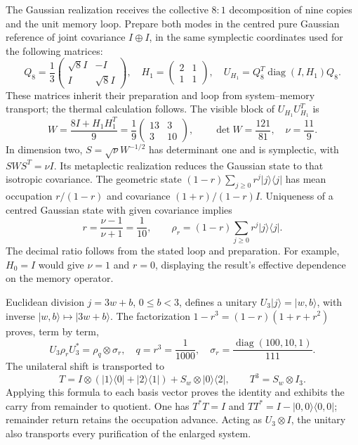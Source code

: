 The Gaussian realization receives the collective $8:1$ decomposition
of nine copies and the unit memory loop. Prepare both modes in the centred
pure Gaussian reference of joint covariance $I\oplus I$, in the same
symplectic coordinates used for the following matrices:
\[
 Q_8=\frac13\begin{pmatrix}\sqrt8 I&-I\\I&\sqrt8 I\end{pmatrix},
 \quad H_1=\begin{pmatrix}2&1\\1&1\end{pmatrix},
 \quad U_{H_1}=Q_8^T\operatorname{diag}(I,H_1)Q_8.
\]
These matrices inherit their preparation and loop from system--memory
transport; the thermal calculation follows. The visible block of
$U_{H_1}U_{H_1}^T$ is
\[
 W=\frac{8I+H_1H_1^T}{9}
 =\frac19\begin{pmatrix}13&3\\3&10\end{pmatrix},
 \qquad\det W=\frac{121}{81},\quad\nu=\frac{11}{9}.
\]
In dimension two, $S=\sqrt\nu W^{-1/2}$ has determinant one and is
symplectic, with $SWS^T=\nu I$. Its metaplectic realization reduces
the Gaussian state to that isotropic covariance. The geometric state
$(1-r)\sum_{j\geq0}r^j|j\rangle\langle j|$ has mean occupation
$r/(1-r)$ and covariance $(1+r)/(1-r)I$. Uniqueness of a centred
Gaussian state with given covariance implies
\begin{equation}
 r=\frac{\nu-1}{\nu+1}=\frac1{10},\qquad
 \rho_r=(1-r)\sum_{j\geq0}r^j|j\rangle\langle j|.
 \label{eq:ii-ter27-williamson}
\end{equation}
The decimal ratio follows from the stated loop and preparation. For
example, $H_0=I$ would give $\nu=1$ and $r=0$, displaying the result's
effective dependence on the memory operator.

Euclidean division $j=3w+b$, $0\leq b<3$, defines a unitary
$U_3|j\rangle=|w,b\rangle$, with inverse
$|w,b\rangle\mapsto|3w+b\rangle$. The factorization
$1-r^3=(1-r)(1+r+r^2)$ proves, term by term,
\begin{equation}
 U_3\rho_rU_3^*=\rho_q\otimes\sigma_r,
 \quad q=r^3=\frac1{1000},\quad
 \sigma_r=\frac{\operatorname{diag}(100,10,1)}{111}.
 \label{eq:ii-ter27-agrupamiento}
\end{equation}
The unilateral shift is transported to
\[
 T=I\otimes(|1\rangle\langle0|+|2\rangle\langle1|)
       +S_w\otimes|0\rangle\langle2|,\qquad T^3=S_w\otimes I_3.
\]
Applying this formula to each basis vector proves the identity and
exhibits the carry from remainder to quotient. One has $T^*T=I$ and
$TT^*=I-|0,0\rangle\langle0,0|$; remainder return retains the
occupation advance. Acting as $U_3\otimes I$, the unitary also
transports every purification of the enlarged system.

